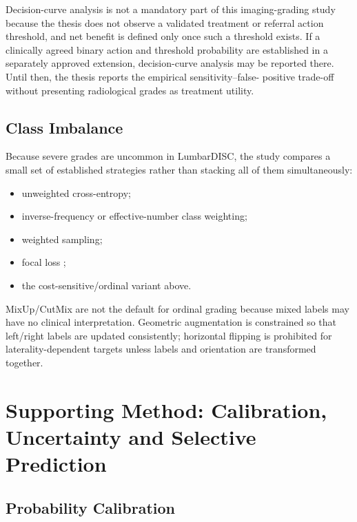 Decision-curve analysis \cite{vickers2006decision} is not a mandatory part of
this imaging-grading study because the thesis does not observe a validated
treatment or referral action threshold, and net benefit is defined only once
such a threshold exists. If a clinically agreed binary action and threshold probability are
established in a separately approved extension, decision-curve analysis may be
reported there. Until then, the thesis reports the empirical sensitivity--false-
positive trade-off without presenting radiological grades as treatment utility.

\subsection{Class Imbalance}
\label{sec:method-imbalance}

Because severe grades are uncommon in LumbarDISC, the study compares a small
set of established strategies rather than stacking all of them simultaneously:

\begin{itemize}
  \item unweighted cross-entropy;
  \item inverse-frequency or effective-number class weighting;
  \item weighted sampling;
  \item focal loss \cite{lin2017focal};
  \item the cost-sensitive/ordinal variant above.
\end{itemize}

MixUp/CutMix are not the default for ordinal grading because mixed labels may
have no clinical interpretation. Geometric augmentation is constrained so that
left/right labels are updated consistently; horizontal flipping is prohibited
for laterality-dependent targets unless labels and orientation are transformed
together.

\section{Supporting Method: Calibration, Uncertainty and Selective Prediction}
\label{sec:method-calibration}

\subsection{Probability Calibration}
\label{sec:method-temperature}

